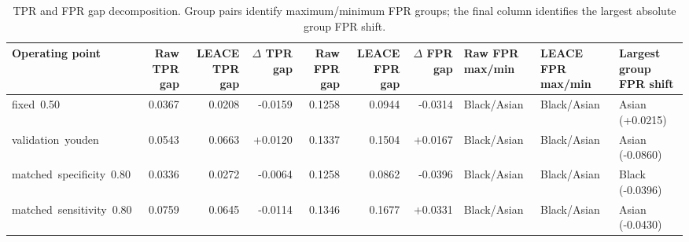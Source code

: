 \begin{table}[htbp]
\centering
\small
\caption{TPR and FPR gap decomposition. Group pairs identify maximum/minimum FPR groups; the final column identifies the largest absolute group FPR shift.}
\label{tab:operating-points-fpr-decomposition}
\begin{tabular}{lrrrrrrlll}
\toprule
Operating point & Raw TPR gap & LEACE TPR gap & $\Delta$ TPR gap & Raw FPR gap & LEACE FPR gap & $\Delta$ FPR gap & Raw FPR max/min & LEACE FPR max/min & Largest group FPR shift \\
\midrule
fixed\ 0.50 & 0.0367 & 0.0208 & -0.0159 & 0.1258 & 0.0944 & -0.0314 & Black/Asian & Black/Asian & Asian (+0.0215) \\
validation\ youden & 0.0543 & 0.0663 & +0.0120 & 0.1337 & 0.1504 & +0.0167 & Black/Asian & Black/Asian & Asian (-0.0860) \\
matched\ specificity\ 0.80 & 0.0336 & 0.0272 & -0.0064 & 0.1258 & 0.0862 & -0.0396 & Black/Asian & Black/Asian & Black (-0.0396) \\
matched\ sensitivity\ 0.80 & 0.0759 & 0.0645 & -0.0114 & 0.1346 & 0.1677 & +0.0331 & Black/Asian & Black/Asian & Asian (-0.0430) \\
\bottomrule
\end{tabular}
\end{table}
